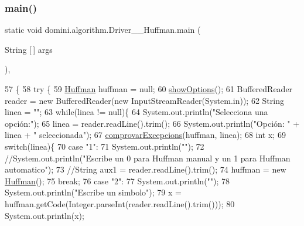 \subsubsection{\texorpdfstring{main()}{main()}}
{\footnotesize\ttfamily static void domini.\+algorithm.\+Driver\+\_\+\+\_\+\+Huffman.\+main (\begin{DoxyParamCaption}\item[{String \mbox{[}$\,$\mbox{]}}]{args }\end{DoxyParamCaption})\hspace{0.3cm}{\ttfamily [inline]}, {\ttfamily [static]}}


\begin{DoxyCode}
57                                            \{
58     \textcolor{keywordflow}{try} \{
59         \hyperlink{classHuffman}{Huffman} huffman = null;
60         \hyperlink{classdomini_1_1algorithm_1_1Driver____Huffman_a0504e4a97aa7c7a0ad7c1a75187adb10}{showOptions}();
61         BufferedReader reader = \textcolor{keyword}{new} BufferedReader(\textcolor{keyword}{new} InputStreamReader(System.in));
62         String linea = \textcolor{stringliteral}{""};
63         \textcolor{keywordflow}{while}(linea != null)\{
64             System.out.println(\textcolor{stringliteral}{"Selecciona una opción:"});
65             linea = reader.readLine().trim();
66             System.out.println(\textcolor{stringliteral}{"Opción: "} + linea + \textcolor{stringliteral}{" seleccionada"});
67             \hyperlink{classdomini_1_1algorithm_1_1Driver____Huffman_a5d56f18f1d8f96dfc735b9a127094319}{comprovarExcepcions}(huffman, linea);
68             \textcolor{keywordtype}{int} x;
69             \textcolor{keywordflow}{switch}(linea)\{
70                 \textcolor{keywordflow}{case} \textcolor{stringliteral}{"1"}:
71                     System.out.println(\textcolor{stringliteral}{""});
72                     \textcolor{comment}{//System.out.println("Escribe un 0 para Huffman manual y un 1 para Huffman
       automatico");}
73                     \textcolor{comment}{//String aux1 = reader.readLine().trim();}
74                     huffman = \textcolor{keyword}{new} \hyperlink{classHuffman}{Huffman}();
75                 \textcolor{keywordflow}{break};
76                 \textcolor{keywordflow}{case} \textcolor{stringliteral}{"2"}:
77                     System.out.println(\textcolor{stringliteral}{""});
78                     System.out.println(\textcolor{stringliteral}{"Escribe un simbolo"});
79                     x = huffman.getCode(Integer.parseInt(reader.readLine().trim()));
80                     System.out.println(x);

\end{DoxyCode}
